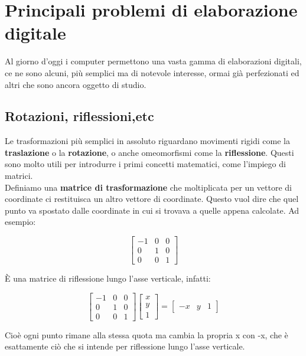 \chapter{Principali problemi di elaborazione digitale}


Al giorno d'oggi i computer permettono una vasta gamma di elaborazioni digitali, ce ne sono alcuni, più semplici ma di notevole interesse, ormai già perfezionati ed altri che sono ancora oggetto di studio.

\section{Rotazioni, riflessioni,etc}
Le trasformazioni più semplici in assoluto riguardano movimenti rigidi come la \textbf{traslazione} o la \textbf{rotazione}, o anche omeomorfismi come la \textbf{riflessione}. Questi sono molto utili per introdurre i primi concetti matematici, come l'impiego di matrici.\\
Definiamo una \textbf{matrice di trasformazione} che moltiplicata per un vettore di coordinate ci restituisca un altro vettore di coordinate. Questo vuol dire che quel punto va spostato dalle coordinate in cui si trovava a quelle appena calcolate. Ad esempio:

$$
{\begin{bmatrix}
-1&0&0\\
0&1&0\\
0&0&1
\end{bmatrix}}
$$

\noindent
\`E una matrice di riflessione lungo l'asse verticale, infatti: 

$$
{\begin{bmatrix}
-1&0&0\\
0&1&0\\
0&0&1
\end{bmatrix}}
\begin{bmatrix}
x\\y\\1
\end{bmatrix}
=
\begin{bmatrix}
-x&y&1
\end{bmatrix}
$$	

\vspace{1em} \noindent
Cioè ogni punto rimane alla stessa quota ma cambia la propria x con -x, che è esattamente ciò che si intende per riflessione lungo l'asse verticale.

